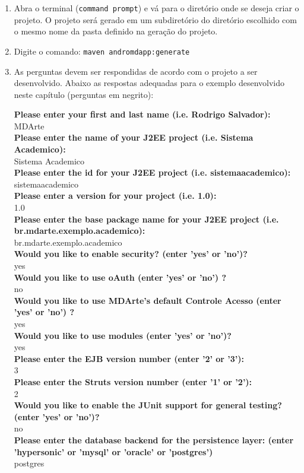 \begin{enumerate}
\item Abra o terminal (\texttt{command prompt}) e vá para o diretório onde se
deseja criar o projeto. O projeto será gerado em um subdiretório do
diretório escolhido com o mesmo nome da pasta definido na geração do projeto.

\item Digite o comando: \texttt{maven andromdapp:generate}

\item As perguntas devem ser respondidas de acordo com o projeto a ser
desenvolvido. Abaixo as respostas adequadas para o exemplo desenvolvido neste
capítulo (perguntas em negrito):

\textbf{Please enter your first and last name (i.e. Rodrigo Salvador):} \\
MDArte\\
\textbf{Please enter the name of your J2EE project (i.e. Sistema Academico):}\\
Sistema Academico\\
\textbf{Please enter the id for your J2EE project (i.e. sistemaacademico):}\\
sistemaacademico\\
\textbf{Please enter a version for your project (i.e. 1.0):}\\
1.0\\
\textbf{Please enter the base package name for your J2EE project (i.e. br.mdarte.exemplo.academico):}\\
br.mdarte.exemplo.academico\\
\textbf{Would you like to enable security? (enter 'yes' or 'no')?}\\
yes\\
\textbf{Would you like to use oAuth (enter 'yes' or 'no') ?}\\
no\\
\textbf{Would you like to use MDArte's default Controle Acesso (enter 'yes' or
'no') ?}\\
yes\\
\textbf{Would you like to use modules (enter 'yes' or 'no')?}\\
yes\\
\textbf{Please enter the EJB version number (enter '2' or '3'):}\\
3\\
\textbf{Please enter the Struts version number (enter '1' or '2'):}\\
2\\
\textbf{Would you like to enable the JUnit support for general testing? (enter
'yes' or 'no')? }\\
 no\\
\textbf{Please enter the database backend for the persistence layer: (enter
'hypersonic' or 'mysql' or 'oracle' or 'postgres')}\\
 postgres\\
 

\end{enumerate}
